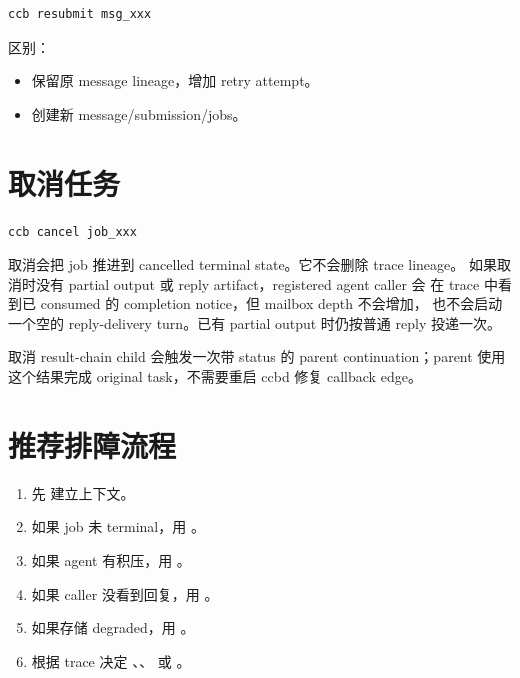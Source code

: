 \begin{lstlisting}
ccb resubmit msg_xxx
\end{lstlisting}

区别：

\begin{itemize}
  \item {} 保留原 message lineage，增加 retry attempt。
  \item {} 创建新 message/submission/jobs。
\end{itemize}

\section{取消任务}

\begin{lstlisting}
ccb cancel job_xxx
\end{lstlisting}

取消会把 job 推进到 cancelled terminal state。它不会删除 trace lineage。
如果取消时没有 partial output 或 reply artifact，registered agent caller 会
在 trace 中看到已 consumed 的 completion notice，但 mailbox depth 不会增加，
也不会启动一个空的 reply-delivery turn。已有 partial output 时仍按普通 reply
投递一次。

取消 result-chain child 会触发一次带  status 的 parent
continuation；parent 使用这个结果完成 original task，不需要重启 ccbd 修复
callback edge。

\section{推荐排障流程}

\begin{enumerate}
  \item 先  建立上下文。
  \item 如果 job 未 terminal，用 。
  \item 如果 agent 有积压，用 。
  \item 如果 caller 没看到回复，用 。
  \item 如果存储 degraded，用 。
  \item 根据 trace 决定 、、 或 。
\end{enumerate}

